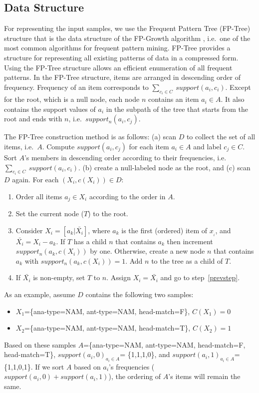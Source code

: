 \subsection{Data Structure}
\label{fptree}
For representing the input samples, we use the Frequent Pattern Tree (FP-Tree) structure that is the data structure of the FP-Growth algorithm \cite{han04}, i.e.\ one of the most common algorithms for frequent pattern mining.
FP-Tree provides a structure for representing all existing patterns of data in a compressed form.
Using the FP-Tree structure allows an efficient enumeration of all frequent patterns.
In the FP-Tree structure, items are arranged in descending order of frequency.
Frequency of an item corresponds to $\sum_{c_i \in C} \: support(a_i, c_i)$.
Except for the root,
which is a null node,
each node $n$ contains an item $a_i \in A$.
It also contains the support values of $a_i$
in the subpath of the tree that starts from the root and ends with $n$, i.e.\ $support_n(a_i,c_j)$.  

The FP-Tree construction method \cite{han04} is as follows:
(a) scan $D$ to collect the set of all items, i.e.\ $A$. 
 Compute $support(a_i,c_j)$ for each item $a_i \in A$ and label $c_j \in C$.
Sort $A$'s members in descending order according to their frequencies, i.e. $\sum_{c_i \in C} \: support(a_i, c_i)$. 
(b) create a null-labeled node as the root, and (c) scan $D$ again. For each $(X_i, c(X_i)) \in D$: 
\begin{enumerate}
 \item Order all items $a_j \in X_i$ according to the order in $A$.
 \item Set the current node ($T$) to the root. 
\item \label{prevstep} Consider $X_{i}=[a_k|\bar {X_i}]$, where $a_k$ is the first (ordered) item of $x_{_i}$, 
and $\bar {X_i}=X_i-a_k$.
If $T$ has a child $n$ that contains $a_k$ 
then increment $support_n(a_k,c(X_i))$ by one.
Otherwise, create a new node $n$ that contains $a_k$ with $support_n(a_k,c(X_i))=1$. 
Add $n$ to the tree as a child of $T$. 
\item If $\bar {X_i}$ is non-empty, set $T$ to $n$. 
 Assign $X_i = \bar {X_i}$ and go to step~\ref{prevstep}.  
\end{enumerate}

As an example, assume $D$ contains the following two samples:
\begin{itemize}
 \item [] $X_1$=\{ana-type=NAM, ant-type=NAM, head-match=F\}, $C(X_1)=0$
 \item[]  $X_2$=\{ana-type=NAM, ant-type=NAM, head-match=T\}, $C(X_2)=1$
\end{itemize}
Based on these samples $A$=\{ana-type=NAM, ant-type=NAM, head-match=F, head-match=T\}, $support(a_i,0)_{a_i \in A}$= \{1,1,1,0\}, and $support(a_i,1)_{a_i \in A}$=\{1,1,0,1\}.
If we sort $A$ based on $a_i$'s frequencies ($support(a_i,0)+support(a_i,1)$), the ordering of $A$'s items will remain the same.

